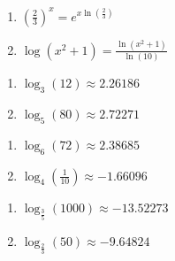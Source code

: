 \documentclass{ximera}
\begin{document}
\begin{multicols}{2}
\begin{enumerate}
\setcounter{enumi}{\value{HW}}

\item $\left(\frac{2}{3}\right)^{x} = e^{x\ln(\frac{2}{3})}$
\item $\log(x^{2} + 1) = \frac{\ln(x^{2} + 1)}{\ln(10)}$

\setcounter{HW}{\value{enumi}}
\end{enumerate}
\end{multicols}

\begin{multicols}{2}
\begin{enumerate}
\setcounter{enumi}{\value{HW}}

\item $\log_{3}(12) \approx 2.26186$
\item $\log_{5}(80) \approx 2.72271$

\setcounter{HW}{\value{enumi}}
\end{enumerate}
\end{multicols}

\begin{multicols}{2}
\begin{enumerate}
\setcounter{enumi}{\value{HW}}

\item $\log_{6}(72) \approx 2.38685$
\item $\log_{4}\left(\frac{1}{10}\right) \approx -1.66096$

\setcounter{HW}{\value{enumi}}
\end{enumerate}
\end{multicols}

\begin{multicols}{2}
\begin{enumerate}
\setcounter{enumi}{\value{HW}}
\item $\log_{\frac{3}{5}}(1000) \approx -13.52273$
\item $\log_{\frac{2}{3}}(50) \approx -9.64824$

\setcounter{HW}{\value{enumi}}
\end{enumerate}
\end{multicols}
\end{document}
